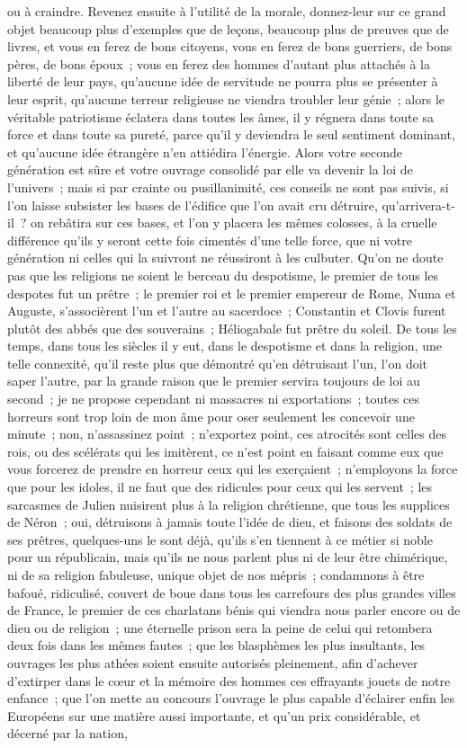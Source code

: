 \documentclass[french,twoside]{book} %
\begin{document}
ou à craindre. Revenez ensuite à l’utilité de la morale, donnez-leur sur ce grand objet beaucoup plus d’exemples que de leçons, beaucoup plus de preuves que de livres, et vous en ferez de bons citoyens, vous en ferez de bons guerriers, de bons pères, de bons époux ; vous en ferez des hommes d’autant plus attachés à la liberté de leur pays, qu’aucune idée de servitude ne pourra plus se présenter à leur esprit, qu’aucune terreur religieuse ne viendra troubler leur génie ; alors le véritable patriotisme éclatera dans toutes les âmes, il y régnera dans toute sa force et dans toute sa pureté, parce qu’il y deviendra le seul sentiment dominant, et qu’aucune idée étrangère n’en attiédira l’énergie. Alors votre seconde génération est sûre et votre ouvrage consolidé par elle va devenir la loi de l’univers ; mais si par crainte ou pusillanimité, ces conseils ne sont pas suivis, si l’on laisse subsister les bases de l’édifice que l’on avait cru détruire, qu’arrivera-t-il ? on rebâtira sur ces bases, et l’on y placera les mêmes colosses, à la cruelle différence qu’ils y seront cette fois cimentés d’une telle force, que ni votre génération ni celles qui la suivront ne réussiront à les culbuter. Qu’on ne doute pas que les religions ne soient le berceau du despotisme, le premier de tous les despotes fut un prêtre ; le premier roi et le premier empereur de Rome, Numa et Auguste, s’associèrent l’un et l’autre au sacerdoce ; Constantin et Clovis furent plutôt des abbés que des souverains ; Héliogabale fut prêtre du soleil. De tous les temps, dans tous les siècles il y eut, dans le despotisme et dans la religion, une telle connexité, qu’il reste plus que démontré qu’en détruisant l’un, l’on doit saper l’autre, par la grande raison que le premier servira toujours de loi au second ; je ne propose cependant ni massacres ni exportations ; toutes ces horreurs sont trop loin de mon âme pour oser seulement les concevoir une minute ; non, n’assassinez point ; n’exportez point, ces atrocités sont celles des rois, ou des scélérats qui les imitèrent, ce n’est point en faisant comme eux que vous forcerez de prendre en horreur ceux qui les exerçaient ; n’employons la force que pour les idoles, il ne faut que des ridicules pour ceux qui les servent ; les sarcasmes de Julien nuisirent plus à la religion chrétienne, que tous les supplices de Néron ; oui, détruisons à jamais toute l’idée de dieu, et faisons des soldats de ses prêtres, quelques-uns le sont déjà, qu’ils s’en tiennent à ce métier si noble pour un républicain, mais qu’ils ne nous parlent plus ni de leur être chimérique, ni de sa religion fabuleuse, unique objet de nos mépris ; condamnons à être bafoué, ridiculisé, couvert de boue dans tous les carrefours des plus grandes villes de France, le premier de ces charlatans bénis qui viendra nous parler encore ou de dieu ou de religion ; une éternelle prison sera la peine de celui qui retombera deux fois dans les mêmes fautes ; que les blasphèmes les plus insultants, les ouvrages les plus athées soient ensuite autorisés pleinement, afin d’achever d’extirper dans le cœur et la mémoire des hommes ces effrayants jouets de notre enfance ; que l’on mette au concours l’ouvrage le plus capable d’éclairer enfin les Européens sur une matière aussi importante, et qu’un prix considérable, et décerné par la nation, 
\end{document}
